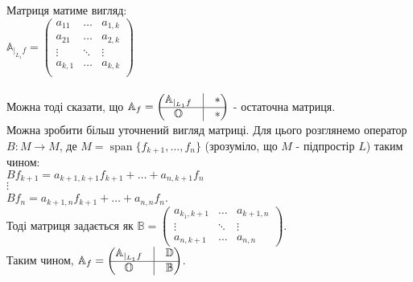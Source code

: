 \documentclass[a4paper, 10pt]{article}
\theoremstyle{theoremdd}
\DeclareMathOperator{\linspan}{span}
\begin{document}
Матриця матиме вигляд:\\
$\mathbb{A}_{|_{L_1}f} = \begin{pmatrix}
a_{11} & \dots & a_{1,k}\\
a_{21} & \dots & a_{2,k}\\
\vdots & \ddots & \vdots\\
a_{k,1} & \dots & a_{k,k}\\
\end{pmatrix}$\\
\\
Можна тоді сказати, що 
$\mathbb{A}_f = \begin{pmatrix}
 \mathbb{A}_{|_{L_1}f}  & \vline & * \\
 \hline
 \mathbb{O} & \vline & *
\end{pmatrix}$ - остаточна матриця.
\bigskip \\
Можна зробити більш уточнений вигляд матриці. Для цього розглянемо оператор $B \colon M \to M$, де $M = \linspan\{f_{k+1},\dots,f_n\}$ (зрозуміло, що $M$ - підпростір $L$) таким чином:\\
$Bf_{k+1} = a_{k+1,k+1}f_{k+1} + \dots + a_{n,k+1}f_n$\\
$\vdots$\\
$Bf_{n} = a_{k+1,n}f_{k+1} + \dots + a_{n,n}f_n$.\\
Тоді матриця задається як $\mathbb{B} = \begin{pmatrix}
a_{k_1,k+1} & \dots & a_{k+1,n} \\
\vdots & \ddots & \vdots \\
a_{n,k+1} & \dots & a_{n,n}
\end{pmatrix}$.\\
Таким чином, $\mathbb{A}_f = \begin{pmatrix}
 \mathbb{A}_{|_{L_1}f}  & \vline & \mathbb{D} \\
 \hline
 \mathbb{O} & \vline & \mathbb{B}
\end{pmatrix}$.
\end{document}
